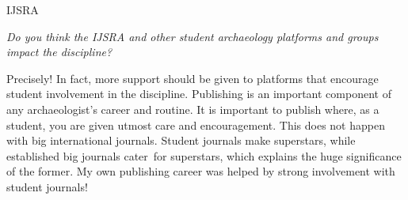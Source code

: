 \documentclass[%
	]{ijsra}
\begin{document}
\begin{labeling}{IJSRA}
\item[IJSRA] \emph{Do you think the IJSRA and other student archaeology platforms and groups impact the discipline?}
	
\item[SC] Precisely! In fact, more support should be given to platforms that encourage student involvement in the discipline. Publishing is an important component of any archaeologist’s career and routine. It is important to publish where, as a student, you are given utmost care and encouragement. This does not happen with big international journals. Student journals make superstars, while established big journals cater for superstars, which explains the huge significance of the former. My own publishing career was helped by strong involvement with student journals!
\end{labeling}
\end{document}
